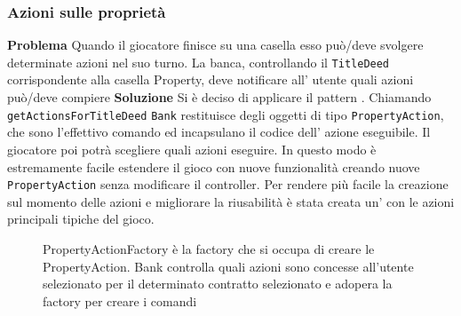 \subsubsection{Azioni sulle proprietà}
\textbf{Problema}\newline
Quando il giocatore finisce su una casella 
esso può/deve svolgere determinate azioni nel suo turno. 
La banca, controllando il \texttt{TitleDeed} corrispondente alla casella Property,  
deve notificare all' utente quali azioni può/deve compiere\newline
\textbf{Soluzione}\newline
Si è deciso di applicare il pattern .\newline
Chiamando \texttt{getActionsForTitleDeed} \texttt{Bank} 
restituisce degli oggetti di tipo \texttt{PropertyAction}, 
che sono l'effettivo comando ed incapsulano il codice dell' azione eseguibile.
Il giocatore poi potrà scegliere quali azioni eseguire.\newline 
In questo modo è estremamente facile estendere il gioco 
con nuove funzionalità creando nuove \texttt{PropertyAction} senza 
modificare il controller.\newline
Per rendere più facile la creazione sul momento delle azioni e 
migliorare la riusabilità è stata creata un’  
con le azioni principali tipiche del gioco.
\begin{figure}[H]
    \centering
    \caption{PropertyActionFactory è la factory che si occupa di creare le PropertyAction. Bank controlla quali azioni sono concesse all'utente selezionato
    per il determinato contratto selezionato e adopera la factory per creare i comandi}
	\label{img:PropertyAction}
\end{figure}